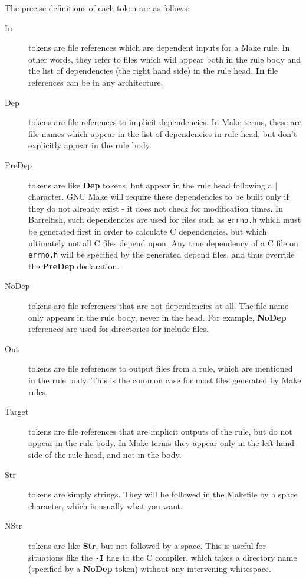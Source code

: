 \documentclass[a4paper,twoside]{report} %
\begin{document}
The precise definitions of each token are as follows:
\begin{description}
\item[In] tokens are file references which are dependent inputs for a
  Make rule.   In other words, they refer to files which will appear
  both in the rule body and the list of dependencies (the right hand
  side) in the rule
  head.  \textbf{In} file references can be in any architecture.

\item[Dep] tokens are file references to implicit dependencies.  In
  Make terms, these are file names which appear in the list of
  dependencies in rule head, but don't explicitly appear in the rule
  body.

\item[PreDep] tokens are like \textbf{Dep} tokens, but appear in the
  rule head following a \textbf{$|$} character.  GNU Make will require
  these dependencies to be built only if they do not already exist -
  it does not check for modification times.  In Barrelfish, such
  dependencies are used for files such as \texttt{errno.h} which must
  be generated first in order to calculate C dependencies, but which
  ultimately not all C files depend upon.  Any true dependency of a C
  file on \texttt{errno.h} will be specified by the generated depend
  files, and thus override the \textbf{PreDep} declaration.

\item[NoDep] tokens are file references that are not dependencies at
  all.  The file name only appears in the rule body, never in the
  head.   For example, \textbf{NoDep} references are used for
  directories for include files.

\item[Out] tokens are file references to output files from a rule,
  which are mentioned in the rule body. This is the common case for
  most files generated by Make rules.

\item[Target] tokens are file references that are implicit outputs of
  the rule, but do not appear in the rule body.  In Make terms they
  appear only in the left-hand side of the rule head, and not in the
  body.

\item[Str] tokens are simply strings.  They will be followed in the
  Makefile by a space character, which is usually what you want.

\item[NStr] tokens are like \textbf{Str}, but not followed by a
  space.  This is useful for situations like the \texttt{-I} flag to
  the C compiler, which takes a directory name (specified by a
  \textbf{NoDep} token) without any intervening whitespace.


\end{description}
\end{document}
